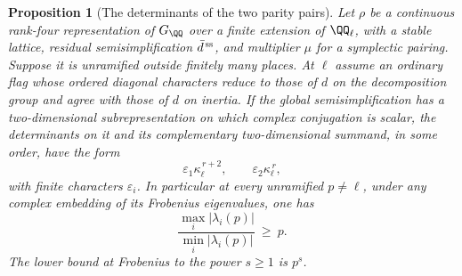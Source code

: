 \documentclass[a4paper,11pt]{article}
\newtheorem{proposition}{Proposition}[section]
\theoremstyle{definition}
\theoremstyle{remark}
\numberwithin{equation}{section}
\begin{document}
\begin{proposition}[The determinants of the two parity pairs]\leavevmode
\label{prop:evenplanedeterminants433}
Let \(\rho\) be a continuous rank-four representation of
\(G_\QQ\) over a finite extension of \(\QQ_\ell\), with a stable
lattice, residual semisimplification \(\bar d^{\,\rm ss}\),
and multiplier \(\mu\) for a symplectic pairing. Suppose it is
unramified outside finitely many places. At \(\ell\) assume an
ordinary flag whose ordered diagonal characters reduce to those
of \(d\) on the decomposition group and agree with those of
\(d\) on inertia. If the global semisimplification has a
two-dimensional subrepresentation on which complex conjugation
is scalar, the determinants on it and its complementary
two-dimensional summand, in some order, have the form
\[
              \varepsilon_1\kappa_\ell^{\,r+2},\qquad
              \varepsilon_2\kappa_\ell^{\,r},
\]
with finite characters \(\varepsilon_i\). In particular at
every unramified \(p\ne\ell\), under any complex embedding of
its Frobenius eigenvalues, one has
\[
        \frac{\max_i|\lambda_i(p)|}{\min_i|\lambda_i(p)|}\ \ge\ p .
\]
The lower bound at Frobenius to the power \(s\ge1\) is \(p^s\).
\end{proposition}
\end{document}
